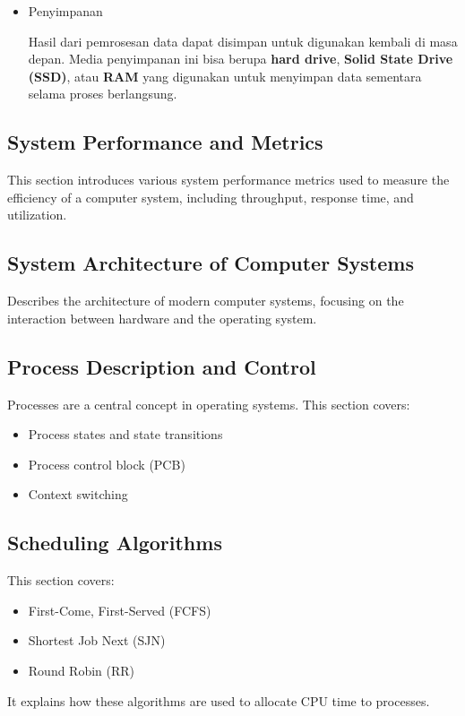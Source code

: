 \documentclass[12pt]{article}
\begin{document}
\begin{itemize}
    \item {Penyimpanan}
    
    Hasil dari pemrosesan data dapat disimpan untuk digunakan kembali di masa depan. Media penyimpanan ini bisa berupa \textbf{hard drive}, \textbf{Solid State Drive (SSD)}, atau \textbf{RAM} yang digunakan untuk menyimpan data sementara selama proses berlangsung.
\end{itemize}

\subsection{System Performance and Metrics}
This section introduces various system performance metrics used to measure the efficiency of a computer system, including throughput, response time, and utilization.

\subsection{System Architecture of Computer Systems}
Describes the architecture of modern computer systems, focusing on the interaction between hardware and the operating system.

\subsection{Process Description and Control}
Processes are a central concept in operating systems. This section covers:
\begin{itemize}
    \item Process states and state transitions
    \item Process control block (PCB)
    \item Context switching
\end{itemize}

\subsection{Scheduling Algorithms}
This section covers:
\begin{itemize}
    \item First-Come, First-Served (FCFS)
    \item Shortest Job Next (SJN)
    \item Round Robin (RR)
\end{itemize}
It explains how these algorithms are used to allocate CPU time to processes.
\end{document}

